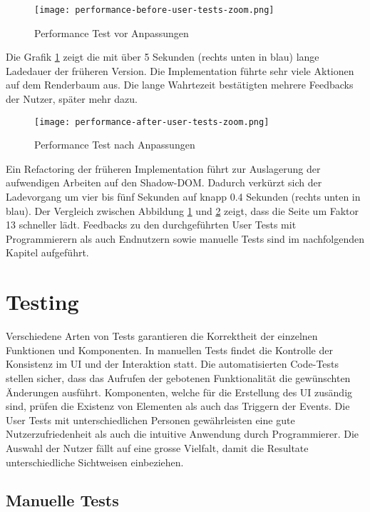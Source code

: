 \begin{figure}[!htb]
    \centering
    \texttt{[image: performance-before-user-tests-zoom.png]}
    \caption{\centering Performance Test vor Anpassungen}
    \label{img:performanceTestBefore}
\end{figure}

Die Grafik \ref{img:performanceTestBefore} zeigt die mit über 5 Sekunden (rechts unten in blau) lange Ladedauer der früheren Version. 
Die Implementation führte sehr viele Aktionen auf dem Renderbaum aus. 
Die lange Wahrtezeit bestätigten mehrere Feedbacks der Nutzer, später mehr dazu. 

\begin{figure}[!htb]
    \centering
    \texttt{[image: performance-after-user-tests-zoom.png]}
    \caption{\centering Performance Test nach Anpassungen}
    \label{img:performanceTestAfter}
\end{figure}

Ein Refactoring der früheren Implementation führt zur Auslagerung der aufwendigen Arbeiten auf den Shadow-DOM. 
Dadurch verkürzt sich der Ladevorgang um vier bis fünf Sekunden auf knapp 0.4 Sekunden (rechts unten in blau). 
Der Vergleich zwischen Abbildung \ref{img:performanceTestBefore} und \ref{img:performanceTestAfter} zeigt, dass die Seite um Faktor 13 schneller lädt. 
Feedbacks zu den durchgeführten User Tests mit Programmierern als auch Endnutzern sowie manuelle Tests sind im nachfolgenden Kapitel aufgeführt. 


\section{Testing}
\label{sec:testing}

Verschiedene Arten von Tests garantieren die Korrektheit der einzelnen Funktionen und Komponenten. 
In manuellen Tests findet die Kontrolle der Konsistenz im UI und der Interaktion statt. 
Die automatisierten Code-Tests stellen sicher, dass das Aufrufen der gebotenen Funktionalität die gewünschten Änderungen ausführt. 
Komponenten, welche für die Erstellung des UI zusändig sind, prüfen die Existenz von Elementen als auch das Triggern der Events. 
Die User Tests mit unterschiedlichen Personen gewährleisten eine gute Nutzerzufriedenheit als auch die intuitive Anwendung durch Programmierer. 
Die Auswahl der Nutzer fällt auf eine grosse Vielfalt, damit die Resultate unterschiedliche Sichtweisen einbeziehen. 


\subsection{Manuelle Tests}
\label{sec:manuelTests}

